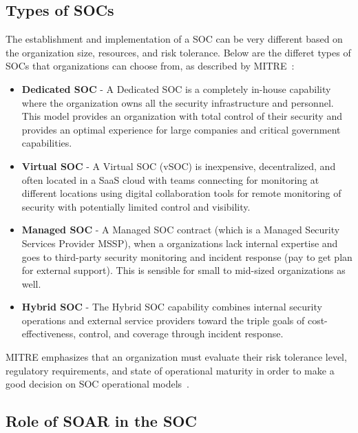 \subsection{Types of SOCs}\vspace{-0.5em}

The establishment and implementation of a SOC can be very different based on the organization size, resources, and risk tolerance. Below are the differet types of SOCs that organizations can choose from, as described by MITRE~\cite{mitre_soc}:
\begin{itemize}[noitemsep, topsep=0pt]
    \item \textbf{Dedicated SOC} - A Dedicated SOC is a completely in-house capability where the organization owns all the security infrastructure and personnel. This model provides an organization with total control of their security and provides an optimal experience for large companies and critical government capabilities.
    \item \textbf{Virtual SOC} - A Virtual SOC (vSOC) is inexpensive, decentralized, and often located in a SaaS cloud with teams connecting for monitoring at different locations using digital collaboration tools for remote monitoring of security with potentially limited control and visibility.
    \item \textbf{Managed SOC} - A Managed SOC contract (which is a Managed Security Services Provider MSSP), when a organizations lack internal expertise and goes to third-party security monitoring and incident response (pay to get plan for external support). This is sensible for small to mid-sized organizations as well.
    \item \textbf{Hybrid SOC} - The Hybrid SOC capability combines internal security operations and external service providers toward the triple goals of cost-effectiveness, control, and coverage through incident response.
\end{itemize}
MITRE emphasizes that an organization must evaluate their risk tolerance level, regulatory requirements, and state of operational maturity in order to make a good decision on SOC operational models~\cite{mitre_soc}.

\subsection{Role of SOAR in the SOC}

